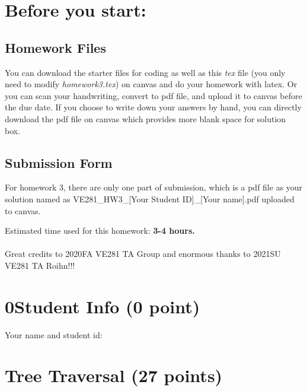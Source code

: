\documentclass[11pt]{exam}
\begin{document}
\setlength{\parindent}{0pt}
\section*{Before you start:}

\subsection*{Homework Files}
You can download the starter files for coding as well as this \textit{tex} file (you only need to modify \textit{homework3.tex}) on canvas and do your homework with latex. Or you can scan your handwriting, convert to pdf file, and upload it to canvas before the due date. If you choose to write down your answers by hand, you can directly download the pdf file on canvas which provides more blank space for solution box.\\

\subsection*{Submission Form}
For homework 3, there are only one part of submission, which is a pdf file as your solution named as VE281\_HW3\_[Your Student ID]\_[Your name].pdf uploaded to canvas.

Estimated time used for this homework: \textbf{3-4 hours.}
\\\\
Great credits to 2020FA VE281 TA Group and enormous thanks to 2021SU VE281 TA Roihn!!!

\newpage
\section*{0\quad Student Info (0 point)}
Your name and student id:
\begin{solution}
\end{solution}

\section{Tree Traversal (27 points)}
\end{document}

